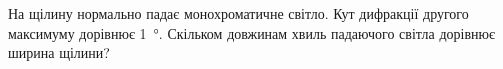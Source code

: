 %
%
^^I^^IНа щілину нормально падає монохроматичне світло. Кут дифракції другого максимуму дорівнює \SI{1}{\degree}. Скільком довжинам хвиль падаючого світла дорівнює ширина щілини?
